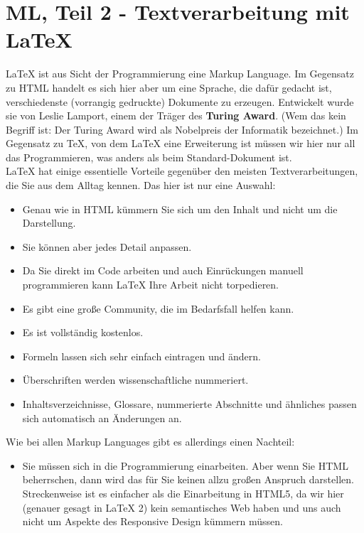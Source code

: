\chapter{ML, Teil 2 - Textverarbeitung mit LaTeX}

LaTeX ist aus Sicht der Programmierung eine Markup Language. Im Gegensatz zu HTML handelt es sich hier aber um eine Sprache, die dafür gedacht ist, verschiedenste (vorrangig gedruckte) Dokumente zu erzeugen. Entwickelt wurde sie von Leslie Lamport, einem der Träger des \textbf{Turing Award}. (Wem das kein Begriff ist: Der Turing Award wird als Nobelpreis der Informatik bezeichnet.) Im Gegensatz zu TeX, von dem LaTeX eine Erweiterung ist müssen wir hier nur all das Programmieren, was anders als beim Standard-Dokument ist.\\

LaTeX hat einige essentielle Vorteile gegenüber den meisten Textverarbeitungen, die Sie aus dem Alltag kennen. Das hier ist nur eine Auswahl:

\begin{itemize}
	\item Genau wie in HTML kümmern Sie sich um den Inhalt und nicht um die Darstellung.
	\item Sie können aber jedes Detail anpassen.
	\item Da Sie direkt im Code arbeiten und auch Einrückungen manuell programmieren kann LaTeX Ihre Arbeit nicht torpedieren.
	\item Es gibt eine große Community, die im Bedarfsfall helfen kann.
	\item Es ist vollständig kostenlos.
	\item Formeln lassen sich sehr einfach eintragen und ändern.
	\item Überschriften werden wissenschaftliche nummeriert.
	\item Inhaltsverzeichnisse, Glossare, nummerierte Abschnitte und ähnliches passen sich automatisch an Änderungen an.
\end{itemize}

Wie bei allen Markup Languages gibt es allerdings einen Nachteil:

\begin{itemize}
	\item Sie müssen sich in die Programmierung einarbeiten. Aber wenn Sie HTML beherrschen, dann wird das für Sie keinen allzu großen Anspruch darstellen. Streckenweise ist es einfacher als die Einarbeitung in HTML5, da wir hier (genauer gesagt in LaTeX 2) kein semantisches Web haben und uns auch nicht um Aspekte des Responsive Design kümmern müssen.
\end{itemize}


